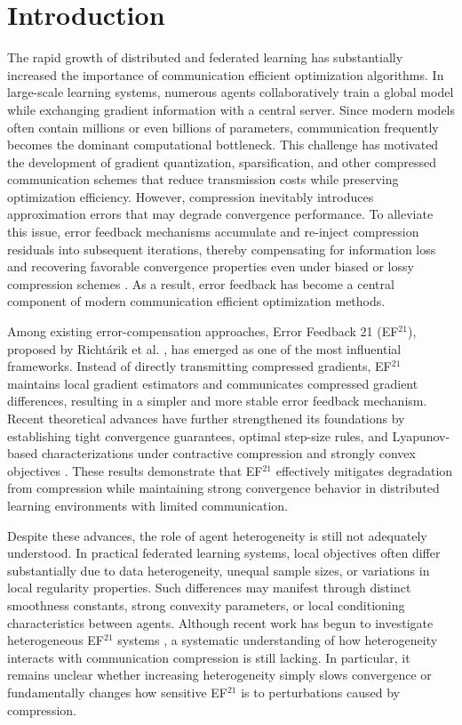 \documentclass[mathematics,article,submit,moreauthors]{Definitions/mdpi}
\begin{document}
\section{Introduction}

The rapid growth of distributed and federated learning has substantially increased the importance of communication efficient optimization algorithms. In large-scale learning systems, numerous agents collaboratively train a global model while exchanging gradient information with a central server. Since modern models often contain millions or even billions of parameters, communication frequently becomes the dominant computational bottleneck. This challenge has motivated the development of gradient quantization, sparsification, and other compressed communication schemes that reduce transmission costs while preserving optimization efficiency. However, compression inevitably introduces approximation errors that may degrade convergence performance. To alleviate this issue, error feedback mechanisms accumulate and re-inject compression residuals into subsequent iterations, thereby compensating for information loss and recovering favorable convergence properties even under biased or lossy compression schemes \cite{seide2014onebit,stich2018sparsified,karimireddy2019error}. As a result, error feedback has become a central component of modern communication efficient optimization methods.

Among existing error-compensation approaches, Error Feedback 21 (\texorpdfstring{EF$^{21}$}{EF21}), proposed by Richt\'arik et al. \cite{richtarik2021ef21}, has emerged as one of the most influential frameworks. Instead of directly transmitting compressed gradients, \texorpdfstring{EF$^{21}$}{EF21} maintains local gradient estimators and communicates compressed gradient differences, resulting in a simpler and more stable error feedback mechanism. Recent theoretical advances have further strengthened its foundations by establishing tight convergence guarantees, optimal step-size rules, and Lyapunov-based characterizations under contractive compression and strongly convex objectives \cite{thomsen2026tight}. These results demonstrate that \texorpdfstring{EF$^{21}$}{EF21} effectively mitigates degradation from compression while maintaining strong convergence behavior in distributed learning environments with limited communication.

Despite these advances, the role of agent heterogeneity is still not adequately understood. In practical federated learning systems, local objectives often differ substantially due to data heterogeneity, unequal sample sizes, or variations in local regularity properties. Such differences may manifest through distinct smoothness constants, strong convexity parameters, or local conditioning characteristics between agents. Although recent work has begun to investigate heterogeneous EF$^{21}$ systems \cite{thomsen2026tight}, a systematic understanding of how heterogeneity interacts with communication compression is still lacking. In particular, it remains unclear whether increasing heterogeneity simply slows convergence or fundamentally changes how sensitive EF$^{21}$ is to perturbations caused by compression. 
\end{document}
